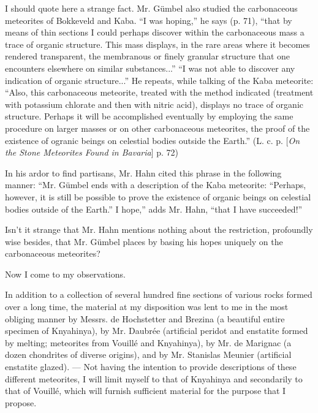 \documentclass[a4paper, 12pt, oneside]{article}
\begin{document}
I should quote here a strange fact. Mr. Gümbel also studied the carbonaceous meteorites of Bokkeveld and Kaba. ``I was hoping,'' he says (p. 71), ``that by means of thin sections I could perhaps discover within the carbonaceous mass a trace of organic structure. This mass displays, in the rare areas where it becomes rendered transparent, the membranous or finely granular structure that one encounters elsewhere on similar substances...'' ``I was not able to discover any indication of organic structure...'' He repeats, while talking of the Kaba meteorite: ``Also, this carbonaceous meteorite, treated with the method indicated (treatment with potassium chlorate and then with nitric acid), displays no trace of organic structure. Perhaps it will be accomplished eventually by employing the same procedure on larger masses or on other carbonaceous meteorites, the proof of the existence of ogranic beings on celestial bodies outside the Earth.'' (L. c. p. [\emph{On the Stone Meteorites Found in Bavaria}] p. 72)

In his ardor to find partisans, Mr. Hahn cited this phrase in the following manner: ``Mr. Gümbel ends with a description of the Kaba meteorite: ``Perhaps, however, it is still be possible to prove the existence of organic beings on celestial bodies outside of the Earth.'' I hope,'' adds Mr. Hahn, ``that I have succeeded!''

Isn't it strange that Mr. Hahn mentions nothing about the restriction, profoundly wise besides, that Mr. Gümbel places by basing his hopes uniquely on the carbonaceous meteorites?

Now I come to my observations.

In addition to a collection of several hundred fine sections of various rocks formed over a long time, the material at my disposition was lent to me in the most obliging manner by Messrs. de Hochstetter and Brezina (a beautiful entire specimen of Knyahinya), by Mr. Daubrée (artificial peridot and enstatite formed by melting; meteorites from Vouillé and Knyahinya), by Mr. de Marignac (a dozen chondrites of diverse origins), and by Mr. Stanislas Meunier (artificial enstatite glazed). --- Not having the intention to provide descriptions of these different meteorites, I will limit myself to that of Knyahinya and secondarily to that of Vouillé, which will furnish sufficient material for the purpose that I propose.
\end{document}
